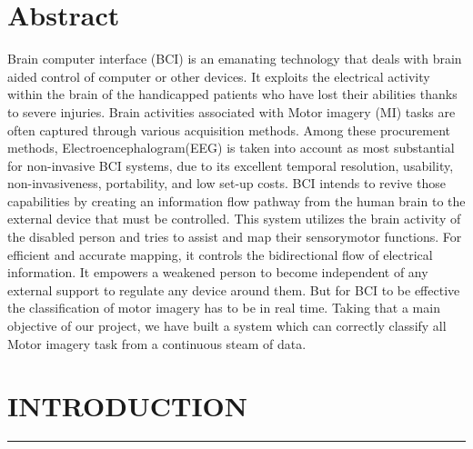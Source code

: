 \documentclass[12pt,a4paper]{report}
\begin{document}
	\chapter*{\centering Abstract}
	\justify Brain computer interface (BCI) is an emanating technology that deals with brain aided control of computer or other devices. It exploits the electrical activity within the brain of the handicapped patients who have lost their abilities thanks to severe injuries. Brain activities associated with Motor imagery (MI) tasks are often captured through various acquisition methods. Among these procurement methods, Electroencephalogram(EEG) is taken into account as most substantial for non-invasive BCI systems, due to its excellent temporal resolution, usability, non-invasiveness, portability, and low set-up costs. BCI intends to revive those capabilities by creating an information flow pathway from the human brain to the external device that must be controlled. This system utilizes the brain activity of the disabled person and tries to assist and map their sensorymotor functions. For efficient and accurate mapping, it controls the bidirectional flow of electrical information. It empowers a weakened person to become independent of any external support to regulate any device around them. But for BCI to be effective the classification of motor imagery has to be in real time. Taking that a main objective of our project, we have built a system which can correctly classify all Motor imagery task from a continuous steam of data.
	
	\newpage
	\setcounter{page}{1}
	\chapter{INTRODUCTION}
	\rule{14.6cm}{.05cm}
\end{document}
